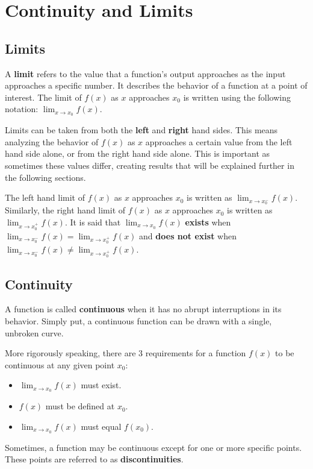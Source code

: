\documentclass{article}
\begin{document}
\section{Continuity and Limits}

\subsection{Limits}
A \textbf{limit} refers to the value that a function's output approaches as the input approaches a specific number. It describes the behavior of a function at a point of interest. The limit of $f(x)$ as $x$ approaches $x_0$ is written using the following notation: $\lim_{x\to x_0} f(x)$. 

Limits can be taken from both the \textbf{left} and \textbf{right} hand sides. This means analyzing the behavior of $f(x)$ as $x$ approaches a certain value from the left hand side alone, or from the right hand side alone. This is important as sometimes these values differ, creating results that will be explained further in the following sections. 

The left hand limit of $f(x)$ as $x$ approaches $x_0$ is written as $\lim_{x\to x_0^-} f(x)$. Similarly, the right hand limit of $f(x)$ as $x$ approaches $x_0$ is written as $\lim_{x\to x_0^+} f(x)$. It is said that $\lim_{x\to x_0} f(x)$ \textbf{exists} when $\lim_{x\to x_0^-} f(x) = \lim_{x\to x_0^+} f(x)$ and \textbf{does not exist} when $\lim_{x\to x_0^-} f(x) \neq \lim_{x\to x_0^+} f(x)$.

\subsection{Continuity}
A function is called \textbf{continuous} when it has no abrupt interruptions in its behavior. Simply put, a continuous function can be drawn with a single, unbroken curve. 

More rigorously speaking, there are 3 requirements for a function $f(x)$ to be continuous at any given point $x_0$: 
\begin{itemize}
  \item $\lim_{x\to x_0} f(x)$ must exist.
  \item $f(x)$ must be defined at $x_0$.
  \item $\lim_{x\to x_0} f(x)$ must equal $f(x_0)$.
\end{itemize}

Sometimes, a function may be continuous except for one or more specific points. These points are referred to as \textbf{discontinuities}.
\end{document}
